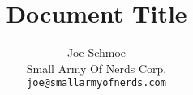 \title{Document Title}
\author{Joe Schmoe\\
  Small Army Of Nerds Corp.\\
  \texttt{joe@smallarmyofnerds.com}}
